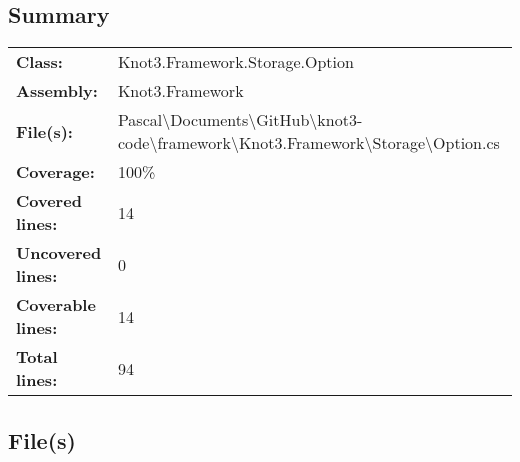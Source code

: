 \documentclass[a4paper,10pt]{article}
\begin{document}
\subsection{Summary}
\begin{longtable}[l]{ll}
\textbf{Class:} & Knot3.Framework.Storage.Option\\
\textbf{Assembly:} & Knot3.Framework\\
\textbf{File(s):} & \begin{minipage}[t]{12cm}{Pascal\textbackslash Documents\textbackslash GitHub\textbackslash knot3-code\textbackslash framework\textbackslash Knot3.Framework\textbackslash Storage\textbackslash Option.cs}\end{minipage} \\
\textbf{Coverage:} & 100\%\\
\textbf{Covered lines:} & 14\\
\textbf{Uncovered lines:} & 0\\
\textbf{Coverable lines:} & 14\\
\textbf{Total lines:} & 94\\
\end{longtable}
\subsection{File(s)}
\end{document}
